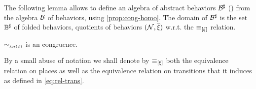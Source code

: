 The following lemma allows to define an algebra of abstract behaviors
${\mathcal{B}}^\sharp$ () from the algebra
$\mathcal{B}$ of behaviors, using \autoref{prop:cong-homo}. The domain
of ${\mathcal{B}}^\sharp$ is the set ${\mathbb{B}}^\sharp$ of folded
behaviors, \ie quotients of behaviors
$(\mathcal{N},\overline{\xi})$ w.r.t. the $\operatorname{{\equiv}}_{[\xi]}$
relation.

\begin{lemmaE}[][category=proofs]\label{lemma:cong-beh-fold}
  $\sim_{\scriptscriptstyle{\mathrm{ker}(\phi)}}$ is an \hrtext{} congruence. 
\end{lemmaE}
\begin{proofE}
  By a small abuse of notation we shall denote by
  $\operatorname{{\equiv}}_{[\xi]}$ both the equivalence relation
  on places as well as the equivalence relation
  on transitions that it induces as defined in
  \autoref{eq:rel-trans}.


\end{proofE}
